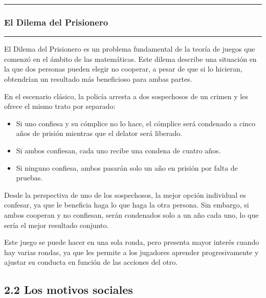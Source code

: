 \documentclass[
]{website}
\providecommand{\tightlist}{%
  \setlength{\itemsep}{0pt}\setlength{\parskip}{0pt}}
\begin{document}
\begin{center}\rule{0.5\linewidth}{0.5pt}\end{center}

\subsubsection*{El Dilema del Prisionero}\label{cuadro2_1}

\begin{center}\rule{0.5\linewidth}{0.5pt}\end{center}

El Dilema del Prisionero es un problema fundamental de la teoría de juegos que comenzó en el ámbito de las matemáticas. Este dilema describe una situación en la que dos personas pueden elegir no cooperar, a pesar de que si lo hicieran, obtendrían un resultado más beneficioso para ambas partes.

En el escenario clásico, la policía arresta a dos sospechosos de un crimen y les ofrece el mismo trato por separado:

\begin{itemize}
\tightlist
\item
  Si uno confiesa y su cómplice no lo hace, el cómplice será condenado a cinco años de prisión mientras que el delator será liberado.
\item
  Si ambos confiesan, cada uno recibe una condena de cuatro años.
\item
  Si ninguno confiesa, ambos pasarán solo un año en prisión por falta de pruebas.
\end{itemize}

Desde la perspectiva de uno de los sospechosos, la mejor opción individual es confesar, ya que le beneficia haga lo que haga la otra persona. Sin embargo, si ambos cooperan y no confiesan, serán condenados solo a un año cada uno, lo que sería el mejor resultado conjunto.

Este juego se puede hacer en una sola ronda, pero presenta mayor interés cuando hay varias rondas, ya que les permite a los jugadores aprender progresivamente y ajustar su conducta en función de las acciones del otro.

\subsection*{2.2 Los motivos sociales}\label{subtema2_2}
\end{document}
